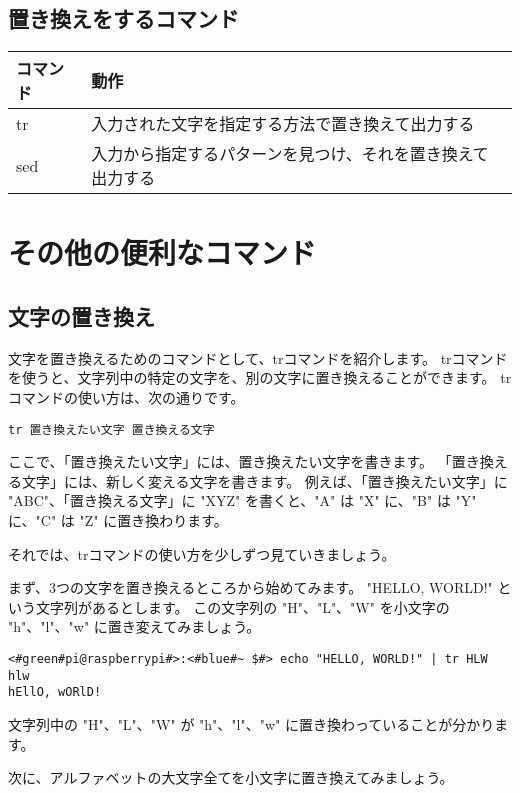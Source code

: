 \subsection{置き換えをするコマンド}
\begin{tabular}{ll}
    コマンド & 動作 \\ \hline
    tr & 入力された文字を指定する方法で置き換えて出力する \\
    sed & 入力から指定するパターンを見つけ、それを置き換えて出力する \\ \hline
\end{tabular}

\section{その他の便利なコマンド}

\subsection{文字の置き換え}
文字を置き換えるためのコマンドとして、trコマンドを紹介します。
trコマンドを使うと、文字列中の特定の文字を、別の文字に置き換えることができます。
trコマンドの使い方は、次の通りです。

\begin{lstlisting}[caption=trコマンドの使い方, label=tr_basic_usage]
tr 置き換えたい文字 置き換える文字
\end{lstlisting}

ここで、「置き換えたい文字」には、置き換えたい文字を書きます。
「置き換える文字」には、新しく変える文字を書きます。
例えば、「置き換えたい文字」に "ABC"、「置き換える文字」に "XYZ" を書くと、"A" は "X" に、"B" は "Y" に、"C" は "Z" に置き換わります。

それでは、trコマンドの使い方を少しずつ見ていきましょう。

まず、3つの文字を置き換えるところから始めてみます。
"HELLO, WORLD!" という文字列があるとします。
この文字列の "H"、"L"、"W" を小文字の "h"、"l"、"w" に置き変えてみましょう。

\begin{lstlisting}[caption=3文字の置き換え, label=tr_3_chars]
<#green#pi@raspberrypi#>:<#blue#~ $#> echo "HELLO, WORLD!" | tr HLW hlw
hEllO, wORlD!
\end{lstlisting}

文字列中の "H"、"L"、"W" が "h"、"l"、"w" に置き換わっていることが分かります。

次に、アルファベットの大文字全てを小文字に置き換えてみましょう。

